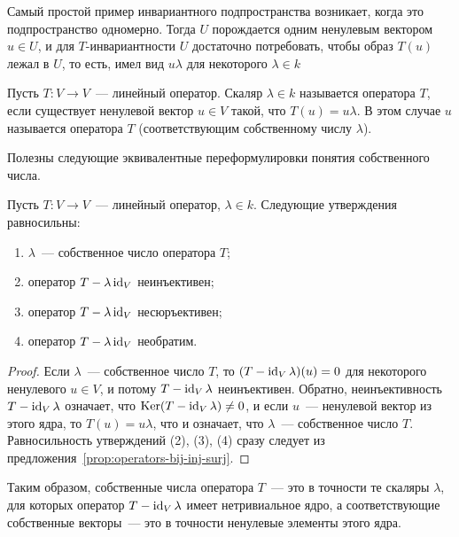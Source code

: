 Самый простой пример инвариантного подпространства возникает, когда
это подпространство одномерно. Тогда $U$ порождается одним ненулевым
вектором $u\in U$, и для $T$-инвариантности $U$ достаточно потребовать,
чтобы образ $T(u)$ лежал в $U$, то есть, имел вид $u\lambda$ для
некоторого $\lambda\in k$
\begin{definition}
Пусть $T\colon V\to V$~--- линейный оператор.
Скаляр $\lambda\in k$ называется  оператора
$T$, если существует ненулевой вектор $u\in V$ такой, что
$T(u) = u\lambda$. В этом случае $u$ называется
 оператора $T$ (соответствующим
собственному числу $\lambda$).
\end{definition}
Полезны следующие эквивалентные переформулировки понятия
собственного числа.
\begin{proposition}\label{prop:eigenvalue-alternative-defs}
Пусть $T\colon V\to V$~--- линейный оператор, $\lambda\in k$.
Следующие утверждения равносильны:
\begin{enumerate}
\item $\lambda$~--- собственное число оператора $T$;
\item оператор $T-\lambda\operatorname{id}_V$ неинъективен;
\item оператор $T-\lambda\operatorname{id}_V$ несюръективен;
\item оператор $T-\lambda\operatorname{id}_V$ необратим.
\end{enumerate}
\end{proposition}
\begin{proof}
Если $\lambda$~--- собственное число $T$, то $(T-\operatorname{id}_V\lambda)(u)=0$
для некоторого ненулевого $u\in V$, и потому $T-\operatorname{id}_V\lambda$
неинъективен. Обратно, неинъективность $T-\operatorname{id}_V\lambda$ означает,
что $\operatorname{Ker}(T-\operatorname{id}_V\lambda)\neq 0$, и если $u$~--- ненулевой вектор из
этого ядра, то $T(u) = u\lambda$, что и означает, что $\lambda$~---
собственное число $T$.
Равносильность утверждений (2), (3), (4) сразу следует из
предложения~\ref{prop:operators-bij-inj-surj}.
\end{proof}
Таким образом, собственные числа оператора $T$~--- это в точности
те скаляры $\lambda$, для которых оператор $T-\operatorname{id}_V\lambda$
имеет нетривиальное ядро, а соответствующие собственные векторы~---
это в точности ненулевые элементы этого ядра.

